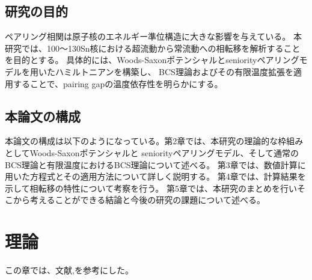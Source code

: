 \documentclass[a4paper]{jsreport}
\begin{document}
  \section{研究の目的}
  ペアリング相関は原子核のエネルギー準位構造に大きな影響を与えている。
  本研究では、100〜130Sn核における超流動から常流動への相転移を解析することを目的とする。
  具体的には、Woods-Saxonポテンシャルとseniorityペアリングモデルを用いたハミルトニアンを構築し、
  BCS理論およびその有限温度拡張を適用することで、pairing gapの温度依存性を明らかにする。

  \section{本論文の構成}
  本論文の構成は以下のようになっている。第2章では、本研究の理論的な枠組みとしてWoods-Saxonポテンシャルと
  seniorityペアリングモデル、そして通常のBCS理論と有限温度におけるBCS理論について述べる。
  第3章では、数値計算に用いた方程式とその適用方法について詳しく説明する。
  第4章では、計算結果を示して相転移の特性について考察を行う。
  第5章では、本研究のまとめを行いそこから考えることができる結論と今後の研究の課題について述べる。

\chapter{理論}
この章では、文献\cite{nucleus.pdf},\cite{thenuclearmanybody}を参考にした。
\end{document}
